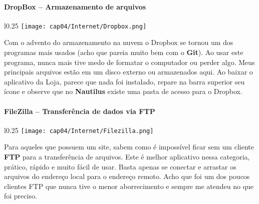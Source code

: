 \paragraph{DropBox – Armazenamento de arquivos}
\begin{minipage}{\linewidth}
 \vspace{5pt}
 \begin{wrapfigure}{l}{0.25\textwidth}
  \vspace{-\baselineskip}
  \texttt{[image: cap04/Internet/Dropbox.png]} 
 \end{wrapfigure}
 Com o advento do armazenamento na nuvem o Dropbox se tornou um dos programas mais usados (acho que pareia muito bem com o \textbf{Git}). Ao usar este programa, nunca mais tive medo de formatar o computador ou perder algo. Meus principais arquivos estão em um disco externo ou armazenados aqui. Ao baixar o aplicativo da Loja, parece que nada foi instalado, repare na barra superior seu ícone e observe que no \textbf{Nautilus} existe uma pasta de acesso para o Dropbox.
\end{minipage}

\paragraph{FileZilla – Transferência de dados via FTP}
\begin{minipage}{\linewidth}
 \vspace{5pt}
 \begin{wrapfigure}{l}{0.25\textwidth}
  \vspace{-\baselineskip}
  \texttt{[image: cap04/Internet/Filezilla.png]} 
 \end{wrapfigure}
 Para aqueles que possuem um site, sabem como é impossível ficar sem um cliente \textbf{FTP} para a transferência de arquivos. Este é melhor aplicativo nessa categoria, prático, rápido e muito fácil de usar. Basta apenas se conectar e arrastar os arquivos do endereço local para o endereço remoto. Acho que foi um dos poucos clientes FTP que nunca tive o menor aborrecimento e sempre me atendeu no que foi preciso.
\end{minipage}

